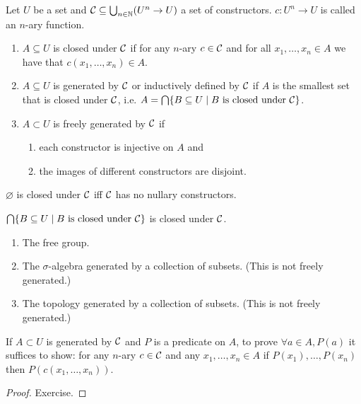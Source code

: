 \begin{defi}
    Let $U$ be a set and $\mathcal{C} \subseteq \bigcup_{n \in \mathbb{N}} (U^n \to U)$ a set of \alert{constructors}.
    $c \colon U^n \to U$ is called an \alert{$n$-ary function}.
    \begin{enumerate}
        \item $A \subseteq U$ is \alert{closed under $\mathcal{C}$} if for any $n$-ary $c \in \mathcal{C}$ and for all $x_1, \dots , x_n \in A$ we have that $c(x_1, \dots, x_n) \in A$.
        \item $A \subseteq U$ is  \alert{generated by $\mathcal{C}$} or \alert{inductively defined by $\mathcal{C}$} if $A$ is the smallest set that is closed under $\mathcal{C}$, i.e. $A = \bigcap \{B \subseteq U \mid B \text{ is closed under } \mathcal{C}\}$.
        \item $A \subset U$ is \alert{freely generated by $\mathcal{C}$} if 
            \begin{enumerate}
                \item each constructor is injective on $A$ and
                \item the images of different constructors are disjoint.
            \end{enumerate}
    \end{enumerate}
\end{defi}

\begin{rem}
$\varnothing$ is closed under $\mathcal{C}$ iff $\mathcal{C}$ has no nullary constructors.
\end{rem}

\begin{exercise}
    $\bigcap \{B \subseteq U \mid B \text{\textup{ is closed under }} \mathcal{C}\}$ is closed under $\mathcal{C}$.
\end{exercise}

\begin{example}
    \hfill
    \begin{enumerate}
        \item The free group.
        \item The $\sigma$-algebra generated by a collection of subsets. (This is not freely generated.)
        \item The topology generated by a collection of subsets. (This is not freely generated.)
    \end{enumerate}
\end{example}

\begin{thm}
    If $A \subset U$ is generated by $\mathcal{C}$ and $P$ is a predicate on $A$, to prove $\forall a \in A, P(a)$ it suffices to show: for any $n$-ary $c \in \mathcal{C}$ and any $x_1, \dots, x_n \in A$ if $P(x_1), \dots, P(x_n)$ then $P(c(x_1, \dots, x_n))$.
\end{thm}
\begin{proof}
    Exercise.
\end{proof}


